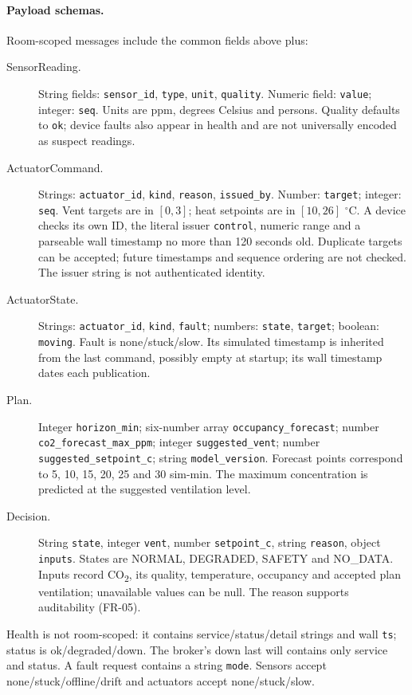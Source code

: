 \documentclass[11pt,a4paper]{article}
\begin{document}
\paragraph{Payload schemas.}
Room-scoped messages include the common fields above plus:
\begin{description}
\item[SensorReading.] String fields: \texttt{sensor\_id}, \texttt{type}, \texttt{unit}, \texttt{quality}. Numeric field: \texttt{value}; integer: \texttt{seq}. Units are ppm, degrees Celsius and persons. Quality defaults to \texttt{ok}; device faults also appear in health and are not universally encoded as suspect readings.
\item[ActuatorCommand.] Strings: \texttt{actuator\_id}, \texttt{kind}, \texttt{reason}, \texttt{issued\_by}. Number: \texttt{target}; integer: \texttt{seq}. Vent targets are in $[0,3]$; heat setpoints are in $[10,26]$ $^\circ$C. A device checks its own ID, the literal issuer \texttt{control}, numeric range and a parseable wall timestamp no more than 120 seconds old. Duplicate targets can be accepted; future timestamps and sequence ordering are not checked. The issuer string is not authenticated identity.
\item[ActuatorState.] Strings: \texttt{actuator\_id}, \texttt{kind}, \texttt{fault}; numbers: \texttt{state}, \texttt{target}; boolean: \texttt{moving}. Fault is none/stuck/slow. Its simulated timestamp is inherited from the last command, possibly empty at startup; its wall timestamp dates each publication.
\item[Plan.] Integer \texttt{horizon\_min}; six-number array \texttt{occupancy\_forecast}; number \texttt{co2\_forecast\_max\_ppm}; integer \texttt{suggested\_vent}; number \texttt{suggested\_setpoint\_c}; string \texttt{model\_version}. Forecast points correspond to 5, 10, 15, 20, 25 and 30 sim-min. The maximum concentration is predicted at the suggested ventilation level.
\item[Decision.] String \texttt{state}, integer \texttt{vent}, number \texttt{setpoint\_c}, string \texttt{reason}, object \texttt{inputs}. States are NORMAL, DEGRADED, SAFETY and NO\_DATA. Inputs record CO\textsubscript{2}, its quality, temperature, occupancy and accepted plan ventilation; unavailable values can be null. The reason supports auditability (FR-05).
\end{description}
Health is not room-scoped: it contains service/status/detail strings and wall \texttt{ts}; status is ok/degraded/down. The broker's down last will contains only service and status. A fault request contains a string \texttt{mode}. Sensors accept none/stuck/offline/drift and actuators accept none/stuck/slow.
\end{document}
